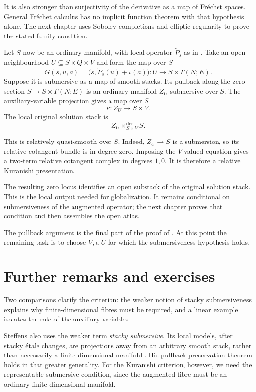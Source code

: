 It is also stronger than surjectivity of the derivative as a map of
Fr\'echet spaces. General Fr\'echet calculus has no implicit function
theorem with that hypothesis alone. The next chapter uses Sobolev
completions and elliptic regularity to prove the stated family condition.

Let $S$ now be an ordinary manifold, with local operator
$\widetilde P_s$ as in .
Take an open neighbourhood
$U\subseteq S\times Q\times V$ and form the map over $S$
\[
 G(s,u,a)=\bigl(s,\widetilde P_s(u)+\iota(a)\bigr)
 \colon U\longrightarrow S\times\Gamma(N;E).
\]
Suppose it is submersive as a map of smooth stacks.
Its pullback along the zero section
$S\to S\times\Gamma(N;E)$ is an ordinary manifold
$Z_U$ submersive over $S$.
The auxiliary-variable projection gives a map over $S$
\[
 \kappa\colon Z_U\longrightarrow S\times V.
\]
The local original solution stack is
\[
 Z_U\times_{S\times V}^{\mathrm{der}}S.
\]

This is relatively quasi-smooth over $S$.
Indeed, $Z_U\to S$ is a submersion, so its relative cotangent bundle
is in degree zero. Imposing the $V$-valued equation gives a
two-term relative cotangent complex in degrees $1,0$.
It is therefore a relative Kuranishi presentation.

The resulting zero locus identifies an open substack of the original
solution stack. This is the local output needed for globalization.
It remains conditional on submersiveness of the augmented operator;
the next chapter proves that condition and then assembles the open atlas.

The pullback argument is the final part of the proof of
\cite[Theorem~3.4.3, following claim~$(*)$]
{Steffens_Representability_Elliptic_Moduli}.
At this point the remaining task is to choose $V,\iota,U$ for which
the submersiveness hypothesis holds.

\section{Further remarks and exercises}

Two comparisons clarify the criterion: the weaker notion of stacky
submersiveness explains why finite-dimensional fibres must be required,
and a linear example isolates the role of the auxiliary variables.

Steffens also uses the weaker term \emph{stacky submersive}.
Its local models, after stacky \'etale changes, are projections
away from an arbitrary smooth stack, rather than necessarily
a finite-dimensional manifold
\cite[Definition~2.2.16]{Steffens_Representability_Elliptic_Moduli}.
His pullback-preservation theorem holds in that greater generality.
For the Kuranishi criterion, however, we need the representable
submersive condition, since the augmented fibre must be an ordinary
finite-dimensional manifold.

